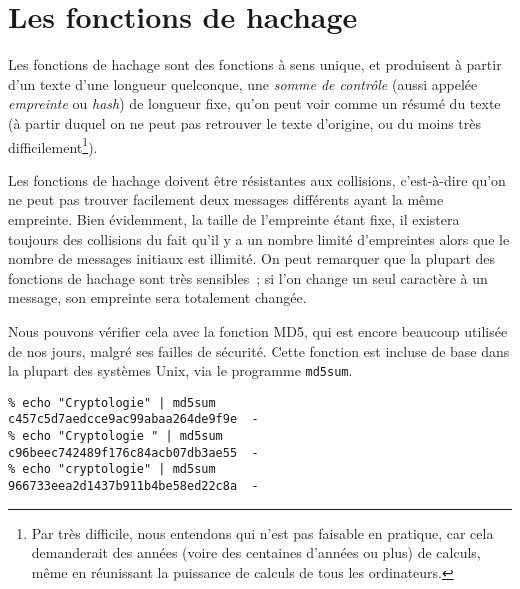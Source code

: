 \section{Les fonctions de hachage\label{sec:FonctionHachage}}
Les fonctions de hachage sont des fonctions à sens unique, et
produisent à partir d'un texte d'une longueur quelconque, une 
\emph{somme de contrôle} (aussi appelée \emph{empreinte}
ou \emph{hash}) de longueur fixe, qu'on peut voir comme un résumé
du texte (à partir duquel on ne peut pas retrouver le texte
d'origine, ou du moins très difficilement\footnote{Par très
difficile, nous entendons qui n'est pas faisable en pratique, car
cela demanderait des années (voire des centaines d'années ou
plus) de calculs, même en réunissant la puissance de calculs de
tous les ordinateurs.}).

Les fonctions de hachage doivent être résistantes aux collisions,
c'est-à-dire qu'on ne peut pas trouver facilement deux messages
différents ayant la même empreinte. Bien évidemment, la taille de
l'empreinte étant fixe, il existera toujours des collisions du fait
qu'il y a un nombre limité d'empreintes alors que le nombre de
messages initiaux est illimité.
On peut remarquer que la plupart des fonctions de hachage sont
très sensibles~; si l'on change un seul caractère à un message, son
empreinte sera totalement changée.

Nous pouvons vérifier cela avec
la fonction MD5, qui est encore beaucoup utilisée de nos jours,
malgré ses failles de sécurité. Cette fonction est incluse de base
dans la plupart des systèmes Unix, via le programme \texttt{md5sum}.

\lstset{language=bash}
\begin{lstlisting}
% echo "Cryptologie" | md5sum
c457c5d7aedcce9ac99abaa264de9f9e  -
% echo "Cryptologie " | md5sum
c96beec742489f176c84acb07db3ae55  -
% echo "cryptologie" | md5sum
966733eea2d1437b911b4be58ed22c8a  -
\end{lstlisting}

